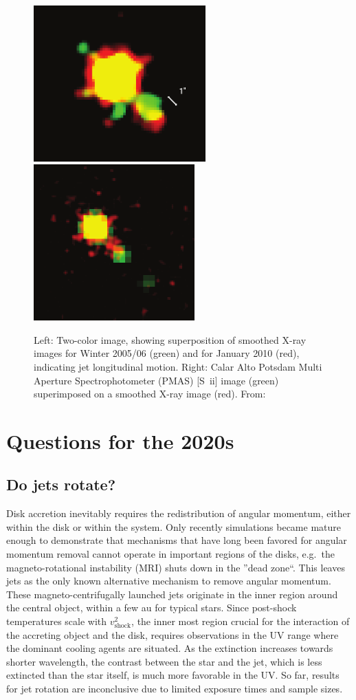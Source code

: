 \documentclass[12pt]{article}
\begin{document}
\begin{figure}[htb]
\centering
\includegraphics[height=6cm]{xjetmotion.png}
\includegraphics[height=6cm]{xjetmotion2.png}
\caption{Left: Two-color image, showing superposition of smoothed X-ray
images for Winter 2005/06 (green) and for January 2010 (red), indicating jet longitudinal motion. Right: Calar Alto Potsdam Multi Aperture Spectrophotometer (PMAS) [S~{\sc ii}] image (green) superimposed on a smoothed X-ray image (red). From:}
\label{fig:Xray}
\end{figure}

\section{Questions for the 2020s}
\subsection{Do jets rotate?}
Disk accretion inevitably requires the redistribution of angular momentum, either within the disk or within the system. Only recently simulations became mature enough to demonstrate that mechanisms that have long been favored for angular momentum removal cannot operate in important regions of the disks, e.g.\ the magneto-rotational instability (MRI) shuts down in the ''dead zone``. This  leaves jets as the only known alternative mechanism to remove angular momentum. These magneto-centrifugally launched jets originate in the inner region around the central object, within a few au for typical stars. Since post-shock temperatures scale with $v^2_\mathrm{shock}$, the inner most region crucial for the interaction of the accreting object and the disk, requires observations in the UV range where the dominant cooling agents are situated.
As the extinction increases towards shorter wavelength, the contrast between the star and the jet, which is less extincted than the star itself, is much more favorable in the UV. So far, results for jet rotation are inconclusive due to limited exposure times and sample sizes. 
\end{document}
